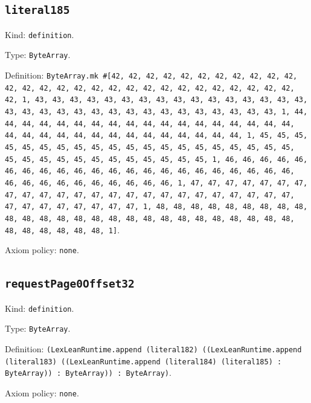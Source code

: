 \documentclass[11pt]{article}
\begin{document}
\subsection*{\texttt{literal185}}
\noindent Kind: \texttt{definition}.\par
\noindent Type: \texttt{ByteArray}.\par
\noindent Definition: \texttt{ByteArray.mk \#[42, 42, 42, 42, 42, 42, 42, 42, 42, 42, 42, 42, 42, 42, 42, 42, 42, 42, 42, 42, 42, 42, 42, 42, 42, 42, 42, 42, 42, 1, 43, 43, 43, 43, 43, 43, 43, 43, 43, 43, 43, 43, 43, 43, 43, 43, 43, 43, 43, 43, 43, 43, 43, 43, 43, 43, 43, 43, 43, 43, 43, 43, 1, 44, 44, 44, 44, 44, 44, 44, 44, 44, 44, 44, 44, 44, 44, 44, 44, 44, 44, 44, 44, 44, 44, 44, 44, 44, 44, 44, 44, 44, 44, 44, 44, 1, 45, 45, 45, 45, 45, 45, 45, 45, 45, 45, 45, 45, 45, 45, 45, 45, 45, 45, 45, 45, 45, 45, 45, 45, 45, 45, 45, 45, 45, 45, 45, 45, 1, 46, 46, 46, 46, 46, 46, 46, 46, 46, 46, 46, 46, 46, 46, 46, 46, 46, 46, 46, 46, 46, 46, 46, 46, 46, 46, 46, 46, 46, 46, 46, 46, 1, 47, 47, 47, 47, 47, 47, 47, 47, 47, 47, 47, 47, 47, 47, 47, 47, 47, 47, 47, 47, 47, 47, 47, 47, 47, 47, 47, 47, 47, 47, 47, 47, 1, 48, 48, 48, 48, 48, 48, 48, 48, 48, 48, 48, 48, 48, 48, 48, 48, 48, 48, 48, 48, 48, 48, 48, 48, 48, 48, 48, 48, 48, 48, 48, 48, 1]}.\par
\noindent Axiom policy: \texttt{none}.\par
\subsection*{\texttt{requestPage0Offset32}}
\noindent Kind: \texttt{definition}.\par
\noindent Type: \texttt{ByteArray}.\par
\noindent Definition: \texttt{(LexLeanRuntime.append (literal182) ((LexLeanRuntime.append (literal183) ((LexLeanRuntime.append (literal184) (literal185) : ByteArray)) : ByteArray)) : ByteArray)}.\par
\noindent Axiom policy: \texttt{none}.\par
\end{document}

